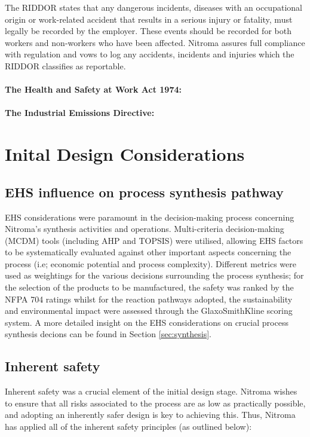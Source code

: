 The RIDDOR states that any dangerous incidents, diseases with an occupational origin or work-related accident that results in a serious injury or fatality, must legally be recorded by the employer. These events should be recorded for both workers and non-workers who have been affected. Nitroma assures full compliance with regulation and vows to log any accidents, incidents and injuries which the RIDDOR classifies as reportable.

\paragraph{The Health and Safety at Work Act 1974:}

\paragraph{The Industrial Emissions Directive:}
 
 
\section{Inital Design Considerations}

\subsection{EHS influence on process synthesis pathway}

EHS considerations were paramount in the decision-making process concerning Nitroma’s synthesis activities and operations. Multi-criteria decision-making (MCDM) tools (including AHP and TOPSIS) were utilised, allowing EHS factors to be systematically evaluated against other important aspects concerning the process (i.e; economic potential and process complexity). Different metrics were used as weightings for the various decisions surrounding the process synthesis; for the selection of the products to be manufactured, the safety was ranked by the NFPA 704 ratings whilst for the reaction pathways adopted, the sustainability and environmental impact were assessed through the GlaxoSmithKline scoring system. A more detailed insight on the EHS considerations on crucial process synthesis decions can be found in Section \ref{sec:synthesis}. 

\subsection{Inherent safety}

Inherent safety was a crucial element of the initial design stage. Nitroma wishes to ensure that all risks associated to the process are as low as practically possible, and adopting an inherently safer design is key to achieving this. Thus, Nitroma has applied all of the inherent safety principles (as outlined below): 

